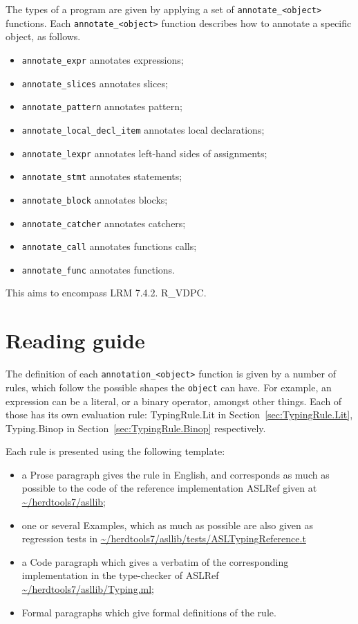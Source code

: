 \documentclass{book}
\begin{document}
The types of a program are given by applying a set of
\texttt{annotate\_<object>} functions. Each \texttt{annotate\_<object>}
function describes how to annotate a specific object, as follows.
\begin{itemize}
\item \texttt{annotate\_expr} annotates expressions;
\item \texttt{annotate\_slices} annotates slices;
\item \texttt{annotate\_pattern} annotates pattern;
\item \texttt{annotate\_local\_decl\_item} annotates local declarations;
\item \texttt{annotate\_lexpr} annotates left-hand sides of assignments;
\item \texttt{annotate\_stmt} annotates statements;
\item \texttt{annotate\_block} annotates blocks;
\item \texttt{annotate\_catcher} annotates catchers;
\item \texttt{annotate\_call} annotates functions calls;
\item \texttt{annotate\_func} annotates functions.
\end{itemize}

This aims to encompass LRM 7.4.2. R\_VDPC.

\section{Reading guide}

The definition of each \texttt{annotation\_<object>} function is given by a number of
rules, which follow the possible shapes the \texttt{object} can have. For 
example, an expression can be a literal, or a binary operator, amongst other
things. Each of those has its own evaluation rule: TypingRule.Lit in
Section~\ref{sec:TypingRule.Lit}, Typing.Binop in
Section~\ref{sec:TypingRule.Binop} respectively.

Each rule is presented using the following template:
\begin{itemize}
\item a Prose paragraph gives the rule in English, and corresponds as much as possible to the code of the reference implementation ASLRef given at \url{~/herdtools7/asllib};
\item one or several Examples, which as much as possible are also given as regression tests in \url{~/herdtools7/asllib/tests/ASLTypingReference.t}
\item a Code paragraph which gives a verbatim of the corresponding implementation in the type-checker of ASLRef \url{~/herdtools7/asllib/Typing.ml};
\item Formal paragraphs which give formal definitions of the rule.
\end{itemize}
\end{document}
